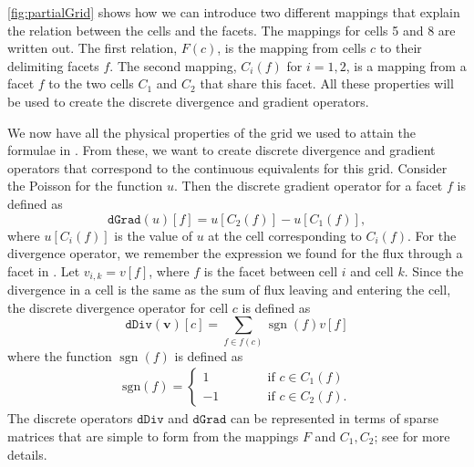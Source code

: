 \autoref{fig:partialGrid} shows how we can introduce two different mappings that explain the relation between the cells and the facets. The mappings for cells 5 and 8 are written out. The first relation, $F(c)$, is the mapping from cells $c$ to their delimiting facets $f$. The second mapping, $C_i(f)$ for $i = 1,2$, is a mapping from a facet $f$ to the two cells $C_1$ and $C_2$ that share this facet. All these properties will be used to create the discrete divergence and gradient operators.

We now have all the physical properties of the grid we used to attain the formulae in . From these, we want to create discrete divergence and gradient operators that correspond to the continuous equivalents for this grid. Consider the Poisson  for the function $u$. Then the discrete gradient operator for a facet $f$ is defined as 
\begin{equation}
    \texttt{dGrad}(u)[f] = u[C_2(f)] - u[C_1(f)], 
    \label{eq:discreteGradient}
\end{equation}
where $u[C_i(f)]$ is the value of $u$ at the cell corresponding to $C_i(f)$. For the divergence operator, we remember the expression we found for the flux through a facet in . Let $v_{i,k} = v[f]$, where $f$ is the facet between cell $i$ and cell $k$. Since the divergence in a cell is the same as the sum of flux leaving and entering the cell, the discrete divergence operator for cell $c$ is defined as 
\begin{equation*}
    \texttt{dDiv}(\textbf{v})[c] = \sum_{f\in f(c)} \operatorname{sgn}(f)v[f]
\end{equation*}
where the function $\operatorname{sgn}(f)$ is defined as 
\begin{align*}
    \text{sgn}(f) = \left\lbrace
    \begin{array}{rl}
        1 \hspace{3em}&\text{if } c \in C_1(f)\\
        -1 \hspace{3em}&\text{if } c \in C_2(f).
    \end{array}
    \right.
\end{align*}
The discrete operators $\texttt{dDiv}$ and $\texttt{dGrad}$ can be represented in terms of sparse matrices that are simple to form from the mappings $F$ and $C_1,C_2$; see \cite{lieMrstUrl} for more details.

